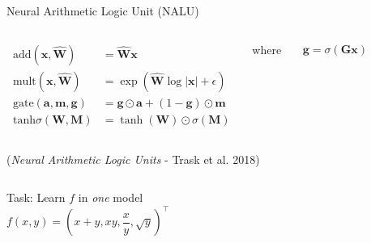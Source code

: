 \documentclass[aspectratio=169,professionalfont,xcolor={dvipsnames},hyperref={colorlinks=true,urlcolor=MidnightBlue}]{beamer}
\newcommand{\add}{\,\mathrm{add}}
\newcommand{\mult}{\,\mathrm{mult}}
\newcommand{\gate}{\,\mathrm{gate}}
\newcommand{\tanhs}{\,\mathrm{tanh}\sigma}
\begin{document}
\begin{frame}{Neural Arithmetic Logic Unit (NALU)}
  \begin{columns}
      

      \begin{align*}
        \add(\bm x, \hat{\bm W}) &= \hat{\bm W} \bm x \\
        \mult(\bm x, \hat{\bm W}) &= \exp(\hat{\bm W} \log |\bm x|+\epsilon) \\
        \gate(\bm a, \bm m, \bm g) &= \bm g \odot \bm a + (1-\bm g) \odot \bm m \\
        \tanhs(\bm W, \bm M) &= \tanh(\bm W)\odot\sigma(\bm M)
      \end{align*}
      \begin{center}where\end{center}
      \begin{align*}
        \bm g = \sigma(\bm G \bm x)
      \end{align*}
  \end{columns}

  \vfill
  {\tiny(\emph{Neural Arithmetic Logic Units}  - Trask et al. 2018)}
\end{frame}

\begin{frame}
  \begin{columns}
    \centering
    Task: Learn $f$ in \emph{one} model
    \begin{equation*}
      f(x,y) = (x+y, xy, \frac{x}{y}, \sqrt{y})^\intercal
    \end{equation*}

  \end{columns}
\end{frame}
\end{document}
